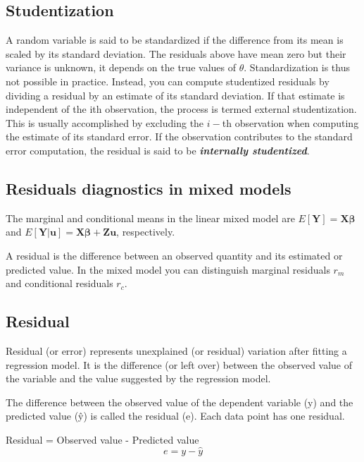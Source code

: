 \documentclass[Main.tex]{subfiles}
\begin{document}
\subsection{Studentization} %

A random variable is said to be standardized if the difference from its mean is scaled by its standard
deviation. The residuals above have mean zero but their variance is unknown, it depends on the true values
of $\theta$. Standardization is thus not possible in practice.
Instead, you can compute studentized residuals
by dividing a residual by an estimate of its standard deviation. If that estimate is independent of the ith
observation, the process is termed external studentization.
This is usually accomplished by excluding the
$i-$th observation when computing the estimate of its standard error. If the observation contributes to the
standard error computation, the residual is said to be \textbf{\emph{internally studentized}}.
\newpage
\subsection{Residuals diagnostics in mixed models}

The marginal and conditional means in the linear mixed model are
$E[\boldsymbol{Y}] = \boldsymbol{X}\boldsymbol{\beta}$ and
$E[\boldsymbol{Y|\boldsymbol{u}}] = \boldsymbol{X}\boldsymbol{\beta} + \boldsymbol{Z}\boldsymbol{u}$, respectively.

A residual is the difference between an observed quantity and its estimated or predicted value. In the mixed
model you can distinguish marginal residuals $r_m$ and conditional residuals $r_c$. 


\subsection{Residual}
Residual (or error) represents unexplained (or residual) variation after fitting a regression model. It is the difference (or left over) between the observed value of the variable and the value suggested by the regression model.



The difference between the observed value of the dependent variable (y) and the predicted value (ŷ) is called the residual (e). Each data point has one residual.

Residual = Observed value - Predicted value 
\[e = y - \hat{y} \]
\end{document}
